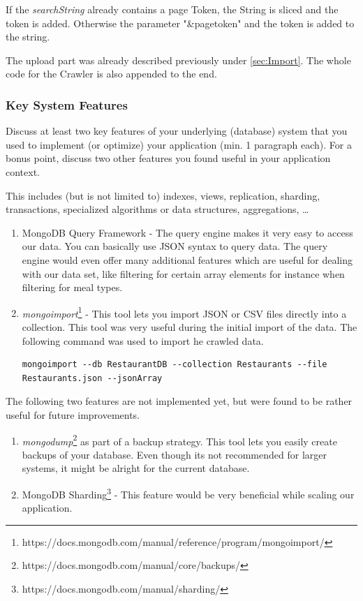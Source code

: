 If the \textit{searchString} already contains a page Token, the String is sliced and the token is added. Otherwise the parameter "\&pagetoken" and the token is added to the string.

The upload part was already described previously under \ref{sec:Import}. The whole code for the Crawler is also appended to the end.

\subsubsection{Key System Features}

Discuss at least two key features of your underlying (database) system that you
used to implement (or optimize) your application (min. 1 paragraph each). For
a bonus point, discuss two other features you found useful in your application
context.

This includes (but is not limited to) indexes, views, replication, sharding,
transactions, specialized algorithms or data structures, aggregations, \ldots

\begin{enumerate}
	\item MongoDB Query Framework - The query engine makes it very easy to access our data. You can basically use JSON syntax to query data. The query engine would even offer many additional features which are useful for dealing with our data set, like filtering for certain array elements for instance when filtering for meal types.
	\item \textit{mongoimport}\footnote{https://docs.mongodb.com/manual/reference/program/mongoimport/} - This tool lets you import JSON or CSV files directly into a collection. This tool was very useful during the initial import of the data. The following command was used to import he crawled data.
\begin{lstlisting}
mongoimport --db RestaurantDB --collection Restaurants --file Restaurants.json --jsonArray
\end{lstlisting}
\end{enumerate}
The following two features are not implemented yet, but were found to be rather useful for future improvements.
\begin{enumerate}
	\item \textit{mongodump}\footnote{https://docs.mongodb.com/manual/core/backups/} as part of a backup strategy. This tool lets you easily create backups of your database. Even though its not recommended for larger systems, it might be alright for the current database.
	\item MongoDB Sharding\footnote{https://docs.mongodb.com/manual/sharding/} - This feature would be very beneficial while scaling our application.  
\end{enumerate}

